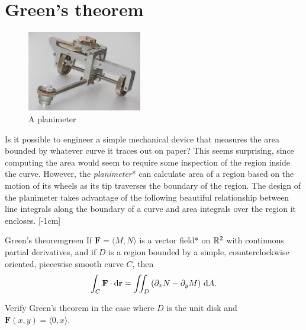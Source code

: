 \documentclass{watsonbook}
\begin{document}
\section{Green's theorem} \label{sec:greens}


\begin{figure}
  \includegraphics[width=5cm]{figures/planimeter}
  \caption{A planimeter \label{fig:planimeter}}
\end{figure}

Is it possible to engineer a simple mechanical device that measures
the area bounded by whatever curve it traces out on paper? This seems
surprising, since computing the area would seem to require some
inspection of the region inside the curve. However, the
\textit{planimeter}* can calculate area of a region based on the
motion of its wheels as its tip traverses the boundary of the region. The
design of the planimeter takes advantage of the following beautiful
relationship between line integrals along the boundary of a curve and
area integrals over the region it encloses. [-1cm]

\begin{theo}{Green's theorem}{green}
  If $\mathbf{F} = \langle M, N\rangle$ is a vector field* on $\mathbb{R}^2$
  with continuous partial derivatives, and if $D$ is a region bounded by a
  simple, counterclockwise oriented, piecewise smooth curve $C$, then
  \[
    \int_C \mathbf{F} \cdot \mathrm{d}\mathbf{r} = \iint_D \left(\partial_x N -
      \partial_y M \right) \, {\mathrm{d}}A. 
  \]
\end{theo}

\begin{example}{}{}
  Verify Green's theorem in the case where $D$ is the unit disk and
  $\mathbf{F}(x,y)= \langle 0, x \rangle$. 
\end{example}
\end{document}
